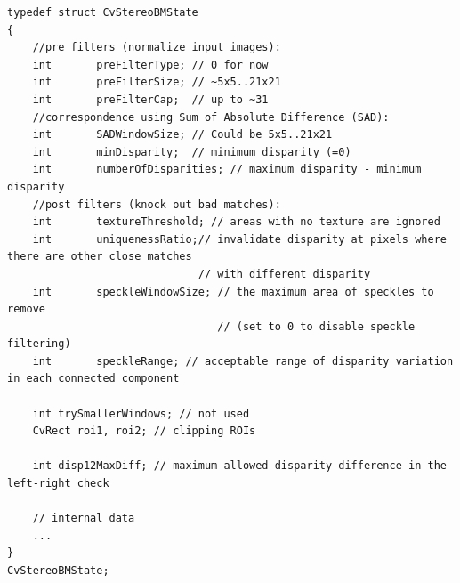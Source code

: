 \ifC
\begin{lstlisting}
typedef struct CvStereoBMState
{
    //pre filters (normalize input images):
    int       preFilterType; // 0 for now
    int       preFilterSize; // ~5x5..21x21
    int       preFilterCap;  // up to ~31
    //correspondence using Sum of Absolute Difference (SAD):
    int       SADWindowSize; // Could be 5x5..21x21
    int       minDisparity;  // minimum disparity (=0)
    int       numberOfDisparities; // maximum disparity - minimum disparity
    //post filters (knock out bad matches):
    int       textureThreshold; // areas with no texture are ignored
    int       uniquenessRatio;// invalidate disparity at pixels where there are other close matches
                              // with different disparity
    int       speckleWindowSize; // the maximum area of speckles to remove
                                 // (set to 0 to disable speckle filtering)
    int       speckleRange; // acceptable range of disparity variation in each connected component
    
    int trySmallerWindows; // not used 
    CvRect roi1, roi2; // clipping ROIs
    
    int disp12MaxDiff; // maximum allowed disparity difference in the left-right check 
    
    // internal data
    ...
}
CvStereoBMState;
\end{lstlisting}
\fi
